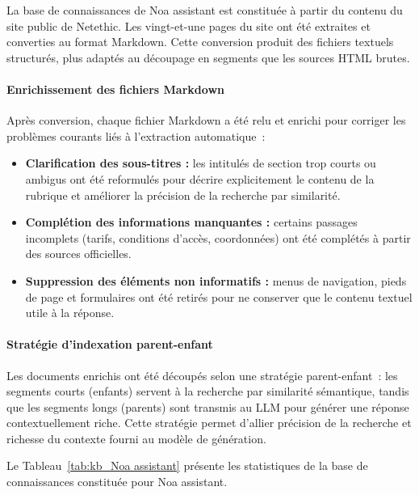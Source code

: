La base de connaissances de Noa assistant est constituée à partir du contenu du site public
de Netethic.
Les vingt-et-une pages du site ont été extraites et converties au format Markdown.
Cette conversion produit des fichiers textuels structurés,
plus adaptés au découpage en segments que les sources HTML brutes.

\paragraph{Enrichissement des fichiers Markdown}\mbox{}\newline

Après conversion, chaque fichier Markdown a été relu et enrichi
pour corriger les problèmes courants liés à l'extraction automatique~:

\begin{itemize}
    \item \textbf{Clarification des sous-titres :} les intitulés de section trop courts
          ou ambigus ont été reformulés pour décrire explicitement le contenu
          de la rubrique et améliorer la précision de la recherche par similarité.
    \item \textbf{Complétion des informations manquantes :} certains passages
          incomplets (tarifs, conditions d'accès, coordonnées) ont été complétés
          à partir des sources officielles.
    \item \textbf{Suppression des éléments non informatifs :} menus de navigation,
          pieds de page et formulaires ont été retirés pour ne conserver
          que le contenu textuel utile à la réponse.
\end{itemize}

\paragraph{Stratégie d'indexation parent-enfant}\mbox{}\newline

Les documents enrichis ont été découpés selon une stratégie parent-enfant~:
les segments courts (enfants) servent à la recherche par similarité sémantique,
tandis que les segments longs (parents) sont transmis au LLM pour générer
une réponse contextuellement riche.
Cette stratégie permet d'allier précision de la recherche et richesse
du contexte fourni au modèle de génération.

Le Tableau~\ref{tab:kb_Noa assistant} présente les statistiques de la base de connaissances
constituée pour Noa assistant.

